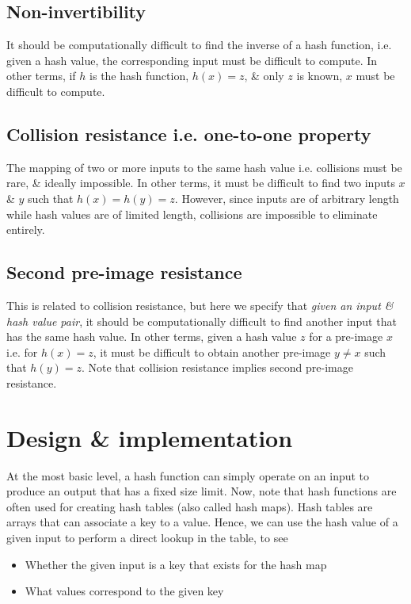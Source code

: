 \subsection{Non-invertibility}
It should be computationally difficult to find the inverse of a hash function, i.e. given a hash value, the corresponding input must be difficult to compute. In other terms, if $h$ is the hash function, $h(x)=z$, \& only $z$ is known, $x$ must be difficult to compute.

\subsection{Collision resistance i.e. one-to-one property}
The mapping of two or more inputs to the same hash value i.e. collisions must be rare, \& ideally impossible. In other terms, it must be difficult to find two inputs $x$ \& $y$ such that $h(x)=h(y)=z$. However, since inputs are of arbitrary length while hash values are of limited length, collisions are impossible to eliminate entirely.

\subsection{Second pre-image resistance}
This is related to collision resistance, but here we specify that \textit{given an input \& hash value pair}, it should be computationally difficult to find another input that has the same hash value. In other terms, given a hash value $z$ for a pre-image $x$ i.e. for $h(x)=z$, it must be difficult to obtain another pre-image $y \neq x$ such that $h(y)=z$. Note that collision resistance implies second pre-image resistance.

\section{Design \& implementation}
At the most basic level, a hash function can simply operate on an input to produce an output that has a fixed size limit. Now, note that hash functions are often used for creating hash tables (also called hash maps). Hash tables are arrays that can associate a key to a value. Hence, we can use the hash value of a given input to perform a direct lookup in the table, to see
\begin{itemize}
	\item Whether the given input is a key that exists for the hash map
	\item What values correspond to the given key
\end{itemize}

